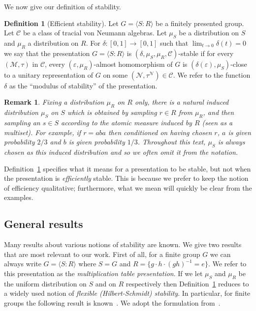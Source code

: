 \documentclass[11pt]{article}
\newtheorem{remark}[theorem]{Remark}
\theoremstyle{definition}
\newtheorem{definition}[theorem]{Definition}
\newcommand{\mC}{\ensuremath{\mathcal{C}}}
\newcommand{\cM}{\ensuremath{\mathcal{M}}}
\newcommand{\eps}{\varepsilon}
\newcommand{\mN}{\mathcal{N}}
\begin{document}
We now give our definition of stability.

\begin{definition}[{\color{red}Efficient} stability]\label{def:eff-stab}
Let $G = \langle S:R\rangle $ be a finitely presented group. Let $\mC$ be a class of tracial von Neumann algebras. Let $\mu_S$ be a distribution on $S$ and $\mu_R$ a distribution on $R$. For $\delta:[0,1]\to[0,1]$ such that $\lim_{t\to 0}\delta(t)=0$ we say that the presentation $G=\langle S:R\rangle$ is $(\delta,\mu_S,\mu_R,\mC)$-stable if for every $(\cM,\tau)$ in $\mC$, every $(\eps,\mu_R)$-almost homomorphism of $G$ is $(\delta(\eps),\mu_S)$-close to a unitary representation of $G$ on some $(\mN,\tau^\mN)\in \mC$. We refer to the function $\delta$ as the ``modulus of stability'' of the presentation.
\end{definition}

\begin{remark}\label{rk-mus}
Fixing a distribution $\mu_R$ on $R$ only, there is a natural induced distribution $\mu_S$ on $S$ which is obtained by sampling $r\in R$ from $\mu_R$, and then sampling an $s\in S$ according to the atomic measure induced by $R$ (seen as a multiset). For example, if $r=aba$ then conditioned on having chosen $r$, $a$ is given probability $2/3$ and $b$ is given probability $1/3$. Throughout this text, $\mu_S$ is always chosen as this induced distribution and so we often omit it from the notation. 
\end{remark}

Definition~\ref{def:eff-stab} specifies what it means for a presentation to be stable, but not when the presentation is \emph{efficiently} stable. This is because we prefer to keep the notion of efficiency qualitative; furthermore, what we mean will quickly be clear from the examples. 


\subsection{General results}

Many results about various notions of stability are known.  We give two results that are most relevant to our work. First of all, 
for a finite group $G$ we can always write $G=\langle S:R\rangle$ where $S = G$ and $R=\{ g\cdot h \cdot (gh)^{-1} =e \}$. We refer to this presentation as the \emph{multiplication table presentation}. If we let $\mu_S$ and $\mu_R$ be the uniform distribution on $S$ and on $R$ respectively then Definition~\ref{def:eff-stab} reduces to a widely used notion of \emph{flexible (Hilbert-Schmidt) stability}. In particular, for finite groups the following result is known~\cite{gowers2017inverse,de2019operator}. We adopt the formulation from~\cite[Theorem 1.4]{de2022spectral}.
\end{document}
